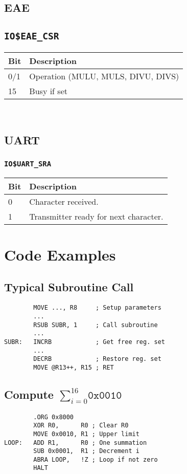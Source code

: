 \documentclass{leaflet}
\begin{document}
  \subsection{EAE}
   \subsection{\texttt{IO\$EAE\_CSR}}
    \begin{center}
     \begin{longtable}{|l|l|}
      \hline
       Bit&Description\\
      \hline
      \hline
       0/1&Operation (MULU, MULS, DIVU, DIVS)\\
       15&Busy if set\\
      \hline
     \end{longtable}
    \end{center}
%
~\vspace*{-20mm}
  \subsection{UART}
   \subsubsection{\texttt{IO\$UART\_SRA}}
    \begin{center}
     \begin{longtable}{|l|l|}
      \hline
       Bit&Description\\
      \hline
      \hline
       0&Character received.\\
       1&Transmitter ready for next character.\\
      \hline
     \end{longtable}
    \end{center}
    \vspace*{-16mm}
%
 \section{Code Examples}
  \subsection{Typical Subroutine Call}
   \begin{verbatim}
        MOVE ..., R8     ; Setup parameters 
        ...
        RSUB SUBR, 1     ; Call subroutine
        ...
SUBR:   INCRB            ; Get free reg. set
        ...
        DECRB            ; Restore reg. set
        MOVE @R13++, R15 ; RET
   \end{verbatim}
\vspace*{-5mm}
  \subsection{Compute $\sum_{i=0}^{16}{\texttt{0x0010}}$}
   \begin{verbatim}
        .ORG 0x8000
        XOR R0,      R0 ; Clear R0
        MOVE 0x0010, R1 ; Upper limit
LOOP:   ADD R1,      R0 ; One summation
        SUB 0x0001,  R1 ; Decrement i
        ABRA LOOP,   !Z ; Loop if not zero
        HALT
   \end{verbatim}
\end{document}
